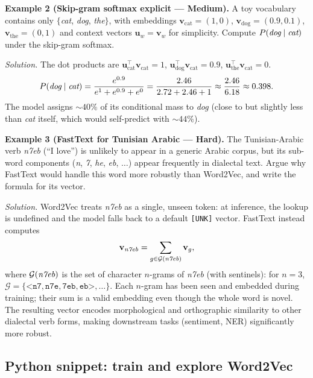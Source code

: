 \medskip

\textbf{Example 2 (Skip-gram softmax explicit --- Medium).}
A toy vocabulary contains only $\{$\emph{cat}, \emph{dog}, \emph{the}$\}$, with embeddings $\mathbf{v}_{\text{cat}} = (1, 0)$, $\mathbf{v}_{\text{dog}} = (0.9, 0.1)$, $\mathbf{v}_{\text{the}} = (0, 1)$ and context vectors $\mathbf{u}_w = \mathbf{v}_w$ for simplicity. Compute $P(\emph{dog} \mid \emph{cat})$ under the skip-gram softmax.

\textit{Solution.}
The dot products are $\mathbf{u}_{\text{cat}}^\top \mathbf{v}_{\text{cat}} = 1$, $\mathbf{u}_{\text{dog}}^\top \mathbf{v}_{\text{cat}} = 0.9$, $\mathbf{u}_{\text{the}}^\top \mathbf{v}_{\text{cat}} = 0$.
\[ P(\emph{dog} \mid \emph{cat}) = \frac{e^{0.9}}{e^{1} + e^{0.9} + e^{0}} = \frac{2.46}{2.72 + 2.46 + 1} \approx \frac{2.46}{6.18} \approx 0.398. \]
The model assigns $\sim 40\%$ of its conditional mass to \emph{dog} (close to but slightly less than \emph{cat} itself, which would self-predict with $\sim 44\%$).

\medskip

\textbf{Example 3 (FastText for Tunisian Arabic --- Hard).}
The Tunisian-Arabic verb \emph{n7eb} (``I love'') is unlikely to appear in a generic Arabic corpus, but its sub-word components (\emph{n}, \emph{7}, \emph{he}, \emph{eb}, $\dots$) appear frequently in dialectal text. Argue why FastText would handle this word more robustly than Word2Vec, and write the formula for its vector.

\textit{Solution.} Word2Vec treats \emph{n7eb} as a single, unseen token: at inference, the lookup is undefined and the model falls back to a default \texttt{[UNK]} vector. FastText instead computes
\[ \mathbf{v}_{\emph{n7eb}} = \sum_{g \in \mathcal{G}(\emph{n7eb})} \mathbf{v}_g, \]
where $\mathcal{G}(\emph{n7eb})$ is the set of character $n$-grams of \emph{n7eb} (with sentinels): for $n = 3$, $\mathcal{G} = \{\texttt{<n7}, \texttt{n7e}, \texttt{7eb}, \texttt{eb>}, \dots\}$. Each $n$-gram has been seen and embedded during training; their sum is a valid embedding even though the whole word is novel. The resulting vector encodes morphological and orthographic similarity to other dialectal verb forms, making downstream tasks (sentiment, NER) significantly more robust.

\subsection{Python snippet: train and explore Word2Vec}

